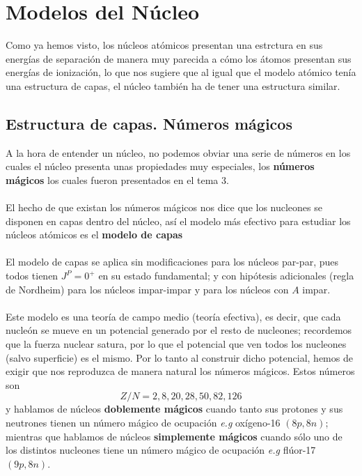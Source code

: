 \pagestyle{fancy}
\chapter{Modelos del Núcleo}
Como ya hemos visto, los núcleos atómicos presentan una estrctura en sus energías de separación de manera muy parecida a cómo los átomos presentan sus energías de ionización, lo que nos sugiere que al igual que el modelo atómico tenía una estructura de capas, el núcleo también ha de tener una estructura similar.
\section{Estructura de capas. Números mágicos}
A la hora de entender un núcleo, no podemos obviar una serie de números en los cuales el núcleo presenta unas propiedades muy especiales, los \textbf{números mágicos} los cuales fueron presentados en el tema 3.
\\\\
El hecho de que existan los números mágicos nos dice que los nucleones se disponen en capas dentro del núcleo, así el modelo más efectivo para estudiar los núcleos atómicos es el \textbf{modelo de capas}\\\\
El modelo de capas se aplica sin modificaciones para los núcleos par-par, pues todos tienen $J^P=0^+$ en su estado fundamental; y con hipótesis adicionales (regla de Nordheim) para los núcleos impar-impar y para los núcleos con $A$ impar.\\\\
Este modelo es una teoría de campo medio (teoría efectiva), es decir, que cada nucleón se mueve en un potencial generado por el resto de nucleones; recordemos que la fuerza nuclear satura, por lo que el potencial que ven todos los nucleones (salvo superficie) es el mismo. Por lo tanto al construir dicho potencial, hemos de exigir que nos reproduzca de manera natural los números mágicos. Estos números son $$Z/N=2,8,20,28,50,82,126$$ y hablamos de núcleos \textbf{doblemente mágicos} cuando tanto sus protones y sus neutrones tienen un número mágico de ocupación \textit{e.g} oxígeno-16 $(8p,8n)$; mientras que hablamos de núcleos \textbf{simplemente mágicos} cuando sólo uno de los distintos nucleones tiene un número mágico de ocupación \textit{e.g} flúor-17 $(9p,8n)$.

